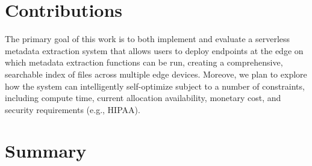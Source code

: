 \documentclass[sigconf]{acmart}
\begin{document}
\section{Contributions}
The primary goal of this work is to both implement and evaluate a serverless metadata extraction system
that allows users to deploy endpoints at the edge on which metadata extraction functions can be run, 
creating a comprehensive, searchable index of files across multiple edge devices. Moreove, we plan to 
explore how the system can intelligently self-optimize subject to a number of constraints, including compute time, 
current allocation availability, monetary cost, and security requirements (e.g., HIPAA). 

\section{Summary}
\end{document}
